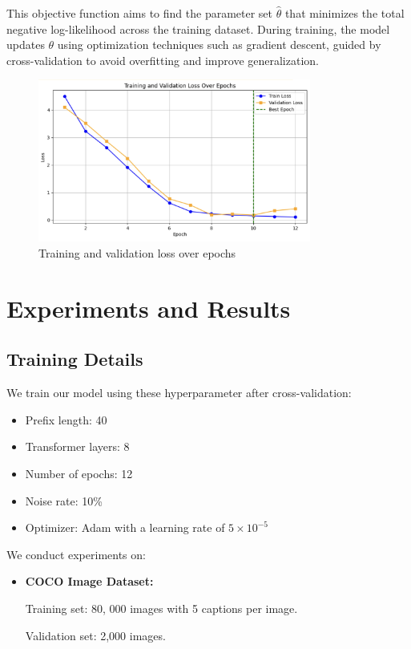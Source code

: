 \documentclass[11pt]{article}
\begin{document}
This objective function aims to find the parameter set $\hat{\theta}$ that minimizes the total negative log-likelihood 
across the training dataset. During training, the model updates $\theta$ using optimization 
techniques such as gradient descent, guided by cross-validation to avoid overfitting and improve generalization.
\begin{figure}[h]
    \centering
    \includegraphics[width=0.8\textwidth]{f2.png}
    \caption{Training and validation loss over epochs}
    \end{figure}
\pagebreak
\section{Experiments and Results}
\subsection{Training Details}
We train our model using these hyperparameter after cross-validation:
\begin{itemize}
  \item Prefix length: 40
  \item Transformer layers: 8
  \item Number of epochs: 12
  \item Noise rate: 10\%
  \item Optimizer: Adam with a learning rate of $5 \times 10^{-5}$
\end{itemize}

We conduct experiments on:
\begin{itemize}
  \item \textbf{COCO Image Dataset:}
  
  Training set: 80, 000 images with 5 captions per image.

  Validation set: 2,000 images.
  
\end{itemize}
\end{document}
